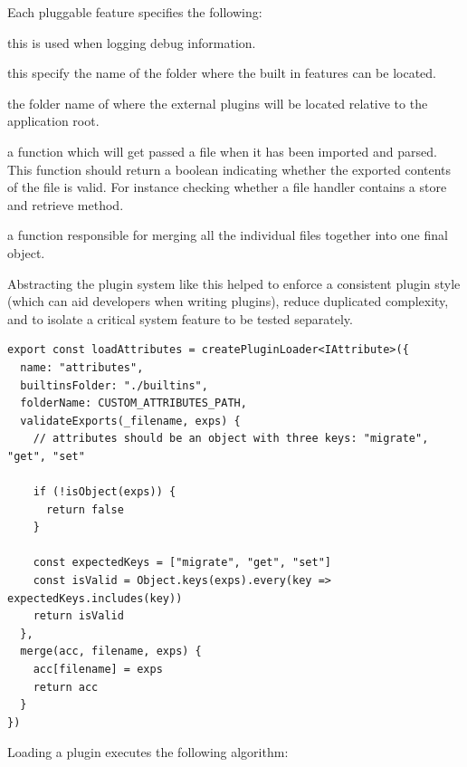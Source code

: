 \documentclass[
  12pt,
]{article}
\providecommand{\tightlist}{%
  \setlength{\itemsep}{0pt}\setlength{\parskip}{0pt}}
\begin{document}
Each pluggable feature specifies the following:

\begin{description}
\tightlist
\item[name]
this is used when logging debug information.
\item[builtinsFolder]
this specify the name of the folder where the built in features can be
located.
\item[folderName]
the folder name of where the external plugins will be located relative
to the application root.
\item[validateExports]
a function which will get passed a file when it has been imported and
parsed. This function should return a boolean indicating whether the
exported contents of the file is valid. For instance checking whether a
file handler contains a store and retrieve method.
\item[merge]
a function responsible for merging all the individual files together
into one final object.
\end{description}

Abstracting the plugin system like this helped to enforce a consistent
plugin style (which can aid developers when writing plugins), reduce
duplicated complexity, and to isolate a critical system feature to be
tested separately.

\begin{lstlisting}[caption={The code required to define the attribute plugin system}]
export const loadAttributes = createPluginLoader<IAttribute>({
  name: "attributes",
  builtinsFolder: "./builtins",
  folderName: CUSTOM_ATTRIBUTES_PATH,
  validateExports(_filename, exps) {
    // attributes should be an object with three keys: "migrate", "get", "set"

    if (!isObject(exps)) {
      return false
    }

    const expectedKeys = ["migrate", "get", "set"]
    const isValid = Object.keys(exps).every(key => expectedKeys.includes(key))
    return isValid
  },
  merge(acc, filename, exps) {
    acc[filename] = exps
    return acc
  }
})
\end{lstlisting}

Loading a plugin executes the following algorithm:
\end{document}
